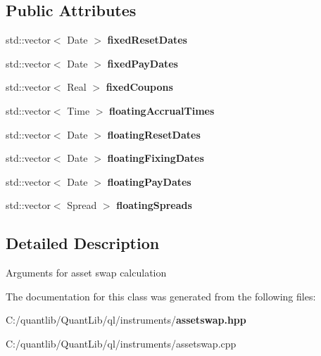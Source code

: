 \subsection*{Public Attributes}
\begin{DoxyCompactItemize}
\item 
std\+::vector$<$ Date $>$ {\bfseries fixed\+Reset\+Dates}\label{class_quant_lib_1_1_asset_swap_1_1arguments_a091c651e59de8edddb770782a61e62e1}

\item 
std\+::vector$<$ Date $>$ {\bfseries fixed\+Pay\+Dates}\label{class_quant_lib_1_1_asset_swap_1_1arguments_a6ccd51314bd61ace6d6c97b31ba3ee14}

\item 
std\+::vector$<$ Real $>$ {\bfseries fixed\+Coupons}\label{class_quant_lib_1_1_asset_swap_1_1arguments_a04cdda1bd4cebd874367cdc4b62923e5}

\item 
std\+::vector$<$ Time $>$ {\bfseries floating\+Accrual\+Times}\label{class_quant_lib_1_1_asset_swap_1_1arguments_a7bf77f3a00ace0983aa7c3827301e557}

\item 
std\+::vector$<$ Date $>$ {\bfseries floating\+Reset\+Dates}\label{class_quant_lib_1_1_asset_swap_1_1arguments_a39762acf216d967c38bd8f4a0b72deeb}

\item 
std\+::vector$<$ Date $>$ {\bfseries floating\+Fixing\+Dates}\label{class_quant_lib_1_1_asset_swap_1_1arguments_adf5febde63a9b46fe16208f070b92267}

\item 
std\+::vector$<$ Date $>$ {\bfseries floating\+Pay\+Dates}\label{class_quant_lib_1_1_asset_swap_1_1arguments_abc702b2d7dcd2878b0fca78f1ae542a4}

\item 
std\+::vector$<$ Spread $>$ {\bfseries floating\+Spreads}\label{class_quant_lib_1_1_asset_swap_1_1arguments_a906070ea97c5dbc57cadaf233ecaa31d}

\end{DoxyCompactItemize}


\subsection{Detailed Description}
Arguments for asset swap calculation 

The documentation for this class was generated from the following files\+:\begin{DoxyCompactItemize}
\item 
C\+:/quantlib/\+Quant\+Lib/ql/instruments/{\bf assetswap.\+hpp}\item 
C\+:/quantlib/\+Quant\+Lib/ql/instruments/assetswap.\+cpp\end{DoxyCompactItemize}
